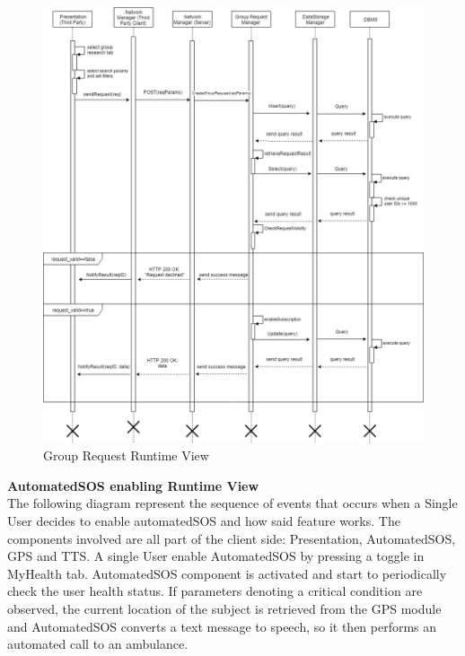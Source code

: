 \documentclass[titlepage]{article}
\begin{document}
\begin{figure}[H]
	\center
  	\includegraphics[width=15cm]{GroupRequest.png}
  	\caption{Group Request Runtime View}
 	\label{fig:GRPREQ}
\end{figure}


{\bf AutomatedSOS enabling Runtime View }\\ 
The following diagram represent the sequence of events that occurs when a Single User decides to enable automatedSOS and how said feature works.
The components involved are all part of the client side: Presentation, AutomatedSOS, GPS and TTS. A single User enable AutomatedSOS by pressing a toggle in MyHealth tab.
AutomatedSOS component is activated and start to periodically check the user health status. If parameters denoting a critical condition are observed, the current location of the subject is retrieved from the GPS module and AutomatedSOS converts a text message to speech, so it then performs an automated call to an ambulance.
\end{document}
